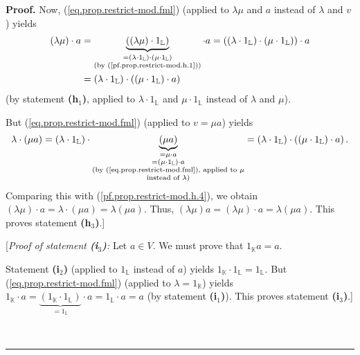 \documentclass[numbers=enddot,12pt,final,onecolumn,notitlepage]{scrartcl}%
\theoremstyle{definition}
\newenvironment{fineprint}{\begin{small}}{\end{small}}
\newenvironment{proof}[1][Proof]{\noindent\textbf{#1.} }{\ \rule{0.5em}{0.5em}}
\begin{document}
\begin{fineprint}
\begin{proof}
Now, (\ref{eq.prop.restrict-mod.fml}) (applied to $\lambda\mu$ and $a$ instead
of $\lambda$ and $v$) yields
\begin{align}
\left(  \lambda\mu\right)  \cdot a  &  =\underbrace{\left(  \left(  \lambda
\mu\right)  \cdot1_{\mathbb{L}}\right)  }_{\substack{=\left(  \lambda
\cdot1_{\mathbb{L}}\right)  \cdot\left(  \mu\cdot1_{\mathbb{L}}\right)
\\\text{(by (\ref{pf.prop.restrict-mod.h.1}))}}}\cdot a=\left(  \left(
\lambda\cdot1_{\mathbb{L}}\right)  \cdot\left(  \mu\cdot1_{\mathbb{L}}\right)
\right)  \cdot a\nonumber\\
&  =\left(  \lambda\cdot1_{\mathbb{L}}\right)  \cdot\left(  \left(  \mu
\cdot1_{\mathbb{L}}\right)  \cdot a\right)  \label{pf.prop.restrict-mod.h.4}%
\end{align}
(by statement \textbf{(h}$_{1}$\textbf{)}, applied to $\lambda\cdot
1_{\mathbb{L}}$ and $\mu\cdot1_{\mathbb{L}}$ instead of $\lambda$ and $\mu$).

But (\ref{eq.prop.restrict-mod.fml}) (applied to $v=\mu a$) yields%
\[
\lambda\cdot\left(  \mu a\right)  =\left(  \lambda\cdot1_{\mathbb{L}}\right)
\cdot\underbrace{\left(  \mu a\right)  }_{\substack{=\mu\cdot a\\=\left(
\mu\cdot1_{\mathbb{L}}\right)  \cdot a\\\text{(by
(\ref{eq.prop.restrict-mod.fml}), applied to }\mu\\\text{instead of }%
\lambda\text{)}}}=\left(  \lambda\cdot1_{\mathbb{L}}\right)  \cdot\left(
\left(  \mu\cdot1_{\mathbb{L}}\right)  \cdot a\right)  .
\]
Comparing this with (\ref{pf.prop.restrict-mod.h.4}), we obtain $\left(
\lambda\mu\right)  \cdot a=\lambda\cdot\left(  \mu a\right)  =\lambda\left(
\mu a\right)  $. Thus, $\left(  \lambda\mu\right)  a=\left(  \lambda
\mu\right)  \cdot a=\lambda\left(  \mu a\right)  $. This proves statement
\textbf{(h}$_{3}$\textbf{)}.]

[\textit{Proof of statement \textbf{(i}}$_{3}$\textit{\textbf{)}:} Let $a\in
V$. We must prove that $1_{\mathbb{K}}a=a$.

Statement \textbf{(i}$_{2}$\textbf{)} (applied to $1_{\mathbb{L}}$ instead of
$a$) yields $1_{\mathbb{K}}\cdot1_{\mathbb{L}}=1_{\mathbb{L}}$. But
(\ref{eq.prop.restrict-mod.fml}) (applied to $\lambda=1_{\mathbb{K}}$) yields
$1_{\mathbb{K}}\cdot a=\underbrace{\left(  1_{\mathbb{K}}\cdot1_{\mathbb{L}%
}\right)  }_{=1_{\mathbb{L}}}\cdot a=1_{\mathbb{L}}\cdot a=a$ (by statement
\textbf{(i}$_{1}$\textbf{)}). This proves statement \textbf{(i}$_{3}%
$\textbf{)}.]


\end{proof}
\end{fineprint}
\end{document}
